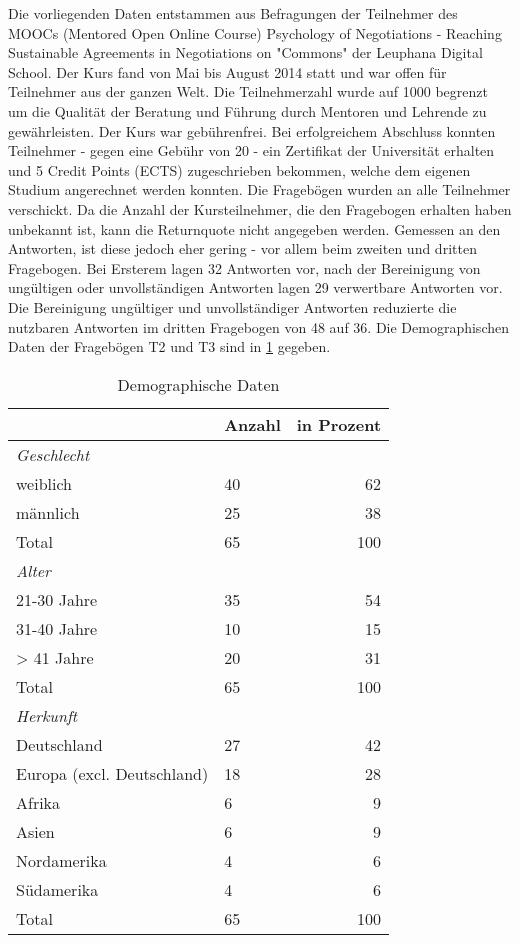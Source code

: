 Die vorliegenden Daten entstammen aus Befragungen der Teilnehmer des MOOCs (Mentored Open Online Course) Psychology of Negotiations - Reaching Sustainable Agreements in Negotiations on "Commons" der Leuphana Digital School. Der Kurs fand von Mai bis August 2014 statt und war offen für Teilnehmer aus der ganzen Welt. Die Teilnehmerzahl wurde auf 1000 begrenzt um die Qualität der Beratung und Führung durch Mentoren und Lehrende zu gewährleisten. Der Kurs war gebührenfrei. Bei erfolgreichem Abschluss konnten   Teilnehmer - gegen eine Gebühr von 20 	\texteuro - ein Zertifikat der Universität erhalten und 5 Credit Points (ECTS) zugeschrieben bekommen, welche dem eigenen Studium angerechnet werden konnten.   
Die Fragebögen wurden an alle Teilnehmer verschickt. Da die Anzahl der Kursteilnehmer, die den Fragebogen erhalten haben unbekannt ist, kann die Returnquote nicht angegeben werden. Gemessen an den Antworten, ist diese jedoch eher gering - vor allem beim zweiten und dritten Fragebogen. Bei Ersterem  lagen 32 Antworten vor, nach der Bereinigung von ungültigen oder unvollständigen Antworten lagen 29 verwertbare Antworten vor. Die Bereinigung ungültiger und unvollständiger Antworten reduzierte die nutzbaren Antworten im dritten Fragebogen von 48 auf 36.
Die Demographischen Daten der Fragebögen T2 und T3 sind in \ref{tab:Demographische Daten} gegeben. 


\begin{table}[ht] 
\caption{Demographische Daten}
\label{tab:Demographische Daten} 
\begin{tabular}{@{}lp{5cm}r@{}} \toprule

 & \textbf{Anzahl}&\textbf{in Prozent} \\ \midrule

\textit{Geschlecht}		& 				& \\ 
weiblich 				&  40 			& 62 \\
männlich				&  25			& 38 \\ 
Total					&  65			& 100 \\
\textit{Alter}			& 				&   \\
21-30 Jahre				&  35			& 54 \\
31-40 Jahre				&  10			& 15	  \\
> 41 Jahre				&  20 			& 31 \\
Total 					&  65			& 100 \\
\textit{Herkunft}		&				&   \\
Deutschland				& 27 			& 42  \\
Europa (excl. Deutschland) &18			& 28  \\
Afrika 					& 6				& 9   \\
Asien 					& 6				& 9   \\
Nordamerika				& 4				& 6   \\
Südamerika				& 4				& 6	 \\
Total					& 65				& 100  \\ 
  \bottomrule

\end{tabular}	
\end{table}


